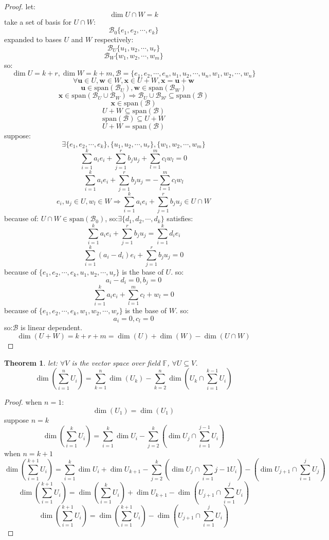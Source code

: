 \documentclass[10pt,a4paper]{article}
\newtheorem{theorem}{Theorem}[section]
\begin{document}
\begin{proof}
    let:\[\dim{U\cap W}=k\]
    take a set of basis for $U\cap W$:
    \[\mathcal{B}_0\{e_1,e_2,\cdots,e_k\}\]
    expanded to bases $U$ and $W$ respectively:
    \[\mathcal{B}_U\{u_1,u_2,\cdots,u_r\}\]
    \[\mathcal{B}_W\{w_1,w_2,\cdots,w_m\}\]
    so:\[\dim{U}=k+r,\dim{W}=k+m,\mathcal{B}=\{e_1,e_2,\cdots,e_n,u_1,u_2,\cdots,u_n,w_1,w_2,\cdots,w_n\}\]
    \[\forall\mathbf{u}\in U,\mathbf{w}\in W,\mathbf{x}\in U+W,\mathbf{x}=\mathbf{u}+\mathbf{w}\]
    \[\mathbf{u}\in\mathrm{span}(\mathcal{B}_U),\mathbf{w}\in\mathrm{span}(\mathcal{B}_W)\]
    \[\mathbf{x}\in\mathrm{span}(\mathcal{B}_U\cup\mathcal{B}_W)\Rightarrow\mathcal{B}_U\cup\mathcal{B_W}\subseteq\mathrm{span}(\mathcal{B})\]
    \[\mathbf{x}\in\mathrm{span}(\mathcal{B})\]
    \[U+W\subseteq\mathrm{span}(\mathcal{B})\]
    \[\mathrm{span}(\mathcal{B})\subseteq U+W\]
    \[U+W=\mathrm{span}(\mathcal{B})\]
    suppose:
    \[\exists \{e_1,e_2,\cdots,e_k\},\{u_1,u_2,\cdots,u_r\},\{w_1,w_2,\cdots,w_m\}\]
    \[\sum\limits_{i=1}^{k}a_ie_i+\sum\limits_{j=1}^{r}b_ju_j+\sum\limits_{l=1}^{m}c_lw_l=0\]
    \[\sum\limits_{i=1}^{k}a_ie_i+\sum\limits_{j=1}^{r}b_ju_j=-\sum\limits_{l=1}^{m}c_lw_l\]
    \[e_i,u_j\in U,w_l\in W\Rightarrow\sum\limits_{i=1}^{k}a_ie_i+\sum\limits_{j=1}^{r}b_ju_j\in U\cap W\]
    because of: $U\cap W\in\mathrm{span}(\mathcal{B}_0)$, so:$\exists\{d_1,d_2,\cdots,d_k\}$ satisfies:
    \[\sum\limits_{i=1}^{k}a_ie_i+\sum\limits_{j=1}^{r}b_ju_j=\sum\limits_{i=1}^{k}d_ie_i\]
    \[\sum\limits_{i=1}^{k}(a_i-d_i)e_i+\sum\limits_{j=1}^{r}b_ju_j=0\]
    because of $\{e_1,e_2,\cdots,e_k,u_1,u_2,\cdots,u_r\}$ is the base of $U$.
    so:\[a_i-d_i=0,b_j=0\]\[\sum\limits_{i=1}^{k}a_ie_i+\sum\limits_{l=1}^{m}c_l+w_l=0\] 
    because of $\{e_1,e_2,\cdots,e_k,w_1,w_2,\cdots,w_r\}$ is the base of $W$.
    so:\[a_i=0,c_l=0\]
    so:$\mathcal{B}$ is linear dependent.
    \[\dim(U+W)=k+r+m=\dim(U)+\dim(W)-\dim(U\cap W)\]
\end{proof}
\begin{theorem}
    let: $\forall V$ is the vector space over field $\mathbb{F}$, $\forall U\subseteq V$.
    \[\dim(\sum\limits_{i=1}^{n}U_i)=\sum\limits_{k=1}^{n}\dim(U_k)-\sum\limits_{k=2}^{n}\dim(U_k\cap\sum\limits_{i=1}^{k-1}U_i)\]
\end{theorem}
\begin{proof}
    when $n=1$:
    \[\dim(U_1)=\dim(U_1)\]
    suppose $n=k$
    \[\dim(\sum\limits_{i=1}^{k}U_i)=\sum\limits_{i=1}^{k}\dim{U_i}-\sum\limits_{j=2}^{k}(\dim U_j\cap\sum\limits_{i=1}^{j-1}U_i)\]
    when $n=k+1$
    \[\dim(\sum\limits_{i=1}^{k+1}U_i)=\sum\limits_{i=1}^{k}\dim{U_i}+\dim{U_{k+1}}-\sum\limits_{j=2}^{k}(\dim{U_j}\cap\sum\limits_{i=1}{j-1}U_i)-(\dim{U_{j+1}}\cap\sum\limits_{i=1}^{j}U_j)\]
    \[\dim(\sum\limits_{i=1}^{k+1}U_i)=\dim(\sum\limits_{i=1}^{k}U_i)+\dim{U_{k+1}}-\dim({U_{j+1}\cap\sum\limits_{i=1}^{j}}U_i)\]
    \[\dim(\sum\limits_{i=1}^{k+1}U_i)=\dim(\sum\limits_{i=1}^{k+1}U_i)-\dim({U_{j+1}\cap\sum\limits_{i=1}^{j}}U_i)\]
\end{proof}
\end{document}
